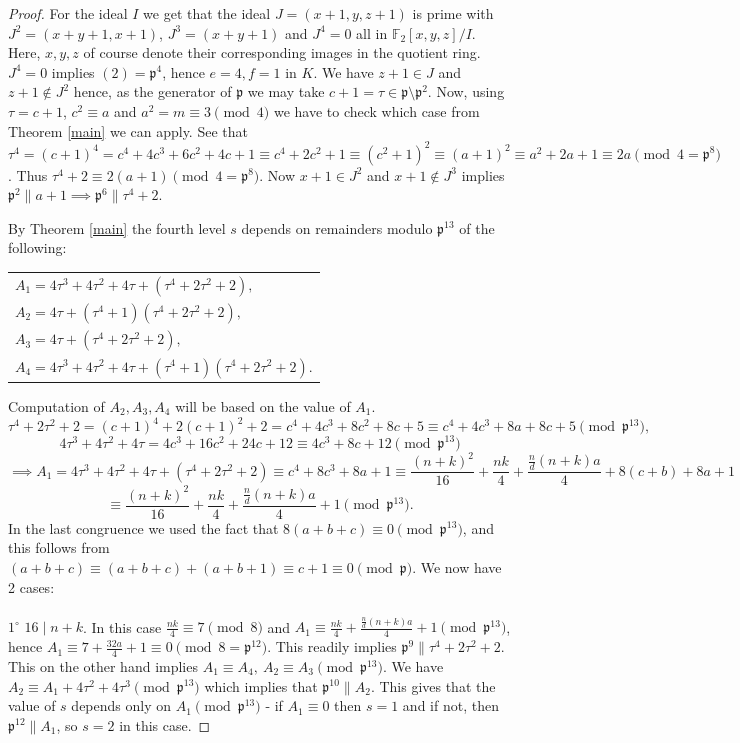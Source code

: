 \documentclass[10pt,a4paper]{amsart}
\newcommand{\p}{\mathfrak{p}}
\begin{document}
\begin{proof}
For the ideal $I$ we get that the ideal $J =  (x+1,y,z+1)$ is prime with $J^2 = (x+y+1,x+1)$, $J^3 = (x+y+1)$ and $J^4= 0$ all in $\mathbb{F}_2[x,y,z]/I$. Here, $x,y,z$ of course denote their corresponding images in the quotient ring. $J^4= 0$ implies $(2) = \mathfrak{p}^4$, hence $e=4,f=1$ in $K$. We have  $z+1 \in J$ and $z+1 \not\in J^2$ hence, as the generator of $\p$ we may take $ c+1 = \tau \in \mathfrak{p}\setminus\mathfrak{p}^2$. Now, using $\tau = c+1$, $c^2 \equiv a$ and $a^2 = m \equiv 3 \pmod{4}$ we have to check which case from Theorem \ref{main} we can apply. See that $\tau^4 = (c+1)^4 = c^4+4c^3+6c^2+4c+1 \equiv c^4+2c^2+1 \equiv (c^2+1)^2 \equiv  (a+1)^2 \equiv a^2+2a+1 \equiv 2a \pmod{4 = \mathfrak{p}^8}$. Thus $\tau^4+2 \equiv 2(a+1) \pmod{4 = \mathfrak{p}^8}$. Now $x+1 \in J^2$ and $x+1 \not\in J^3$ implies $\mathfrak{p}^2 \parallel a+1 \implies \mathfrak{p}^6 \parallel \tau^4+2$.


By Theorem \ref{main} the fourth level $s$ depends on remainders modulo $\mathfrak{p}^{13}$ of the following:
\begin{center}
\begin{tabular}{@{}l@{}}
    $A_1 = 4\tau^3+4\tau^2+4\tau+(\tau^4+2\tau^2+2),$\\
    $A_2 = 4\tau + (\tau^4+1)(\tau^4+2\tau^2+2),$\\
    $A_3 = 4\tau + (\tau^4+2\tau^2+2), $\\
    $A_4= 4\tau^3+4\tau^2+4\tau+(\tau^4+1)(\tau^4+2\tau^2+2). $
\end{tabular}
\end{center}
Computation of $A_2,A_3,A_4$ will be based on the value of $A_1$.
\[\tau^4+2\tau^2+2 = (c+1)^4 + 2(c+1)^2+2 = c^4 + 4c^3 + 8c^2+8c+5 \equiv c^4+ 4c^3+8a+8c+5 \pmod{\mathfrak{p}^{13}},\]
\[4\tau^3 + 4\tau^2 + 4\tau = 4c^3+16c^2+24c+12 \equiv 4c^3+8c+12 \pmod{\mathfrak{p}^{13}} \]
\[ \implies A_1 = 4\tau^3+4\tau^2+4\tau+(\tau^4+2\tau^2+2) \equiv c^4+8c^3+8a+1 \equiv   \frac{(n+k)^2}{16} + \frac{nk}{4} + \frac{\frac{n}{d}(n+k)a}{4} + 8(c+b) + 8a + 1 \]
\[ \equiv \frac{(n+k)^2}{16} + \frac{nk}{4} + \frac{\frac{n}{d}(n+k)a}{4} + 1  \pmod{\mathfrak{p}^{13}}. \]
In the last congruence we used the fact that $8(a+b+c) \equiv 0 \pmod{\mathfrak{p}^{13}}$, and this follows from $(a+b+c) \equiv (a+b+c) + (a+b+1) \equiv c+1 \equiv 0 \pmod{\mathfrak{p}}$. We now have 2 cases:
\\ \\
$1^{\circ}$ $16 \mid n+k$. In this case $\frac{nk}{4} \equiv 7 \pmod{8}$ and $A_1 \equiv \frac{nk}{4} + \frac{\frac{n}{d}(n+k)a}{4} + 1  \pmod{\mathfrak{p}^{13}}$, hence $A_1 \equiv 7 + \frac{32a}{4}+ 1 \equiv 0 \pmod{8 = \mathfrak{p}^{12}}$. This readily implies $\mathfrak{p}^{9} \parallel \tau^4+2\tau^2+2$. This on the other hand implies $A_1 \equiv A_4, \  A_2 \equiv A_3 \pmod{\mathfrak{p}^{13}}$. We have $A_2 \equiv A_1 + 4\tau^2+4\tau^3 \pmod{\mathfrak{p}^{13}}$ which implies that $\mathfrak{p}^{10} \parallel A_2$. This gives that the value of $s$ depends only on $A_1 \pmod{\mathfrak{p}^{13}}$ - if $A_1 \equiv 0$ then $s=1$ and if not, then $\mathfrak{p}^{12} \parallel A_1$, so $s=2$ in this case.




\end{proof}
\end{document}
